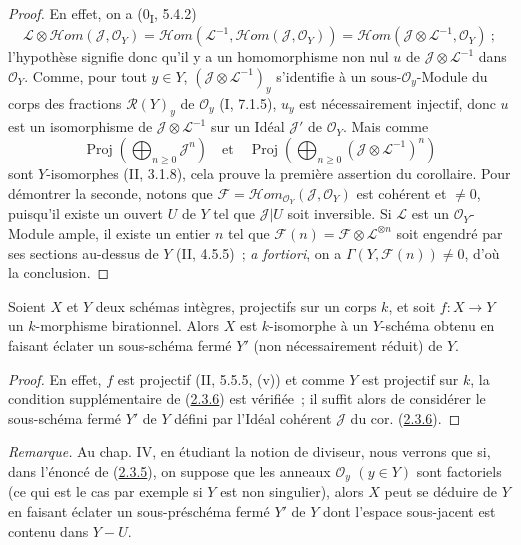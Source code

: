 \begin{proof}
En effet, on a (0\textsubscript{I}, 5.4.2)
\[
\mathcal L\otimes\mathcal{H}om(\mathcal J,\mathcal O_Y)
=\mathcal{H}om(\mathcal L^{-1},\mathcal{H}om(\mathcal J,\mathcal O_Y))
=\mathcal{H}om(\mathcal J\otimes\mathcal L^{-1},\mathcal O_Y)~;
\]
l'hypothèse signifie donc qu'il y a un homomorphisme non nul $u$ de
$\mathcal J\otimes\mathcal L^{-1}$ dans $\mathcal O_Y$. Comme, pour tout
$y\in Y$, $(\mathcal J\otimes\mathcal L^{-1})_y$ s'identifie à un
sous-$\mathcal O_y$-Module du corps des fractions $\mathcal R(Y)_y$ de
$\mathcal O_y$ (I, 7.1.5), $u_y$ est nécessairement injectif, donc $u$
est un isomorphisme de $\mathcal J\otimes\mathcal L^{-1}$ sur un Idéal
$\mathcal J'$ de $\mathcal O_Y$. Mais comme
\[
\operatorname{Proj}\left(\bigoplus_{n\geq0}\mathcal J^n\right)
\quad\text{et}\quad
\operatorname{Proj}\left(
\bigoplus_{n\geq0}(\mathcal J\otimes\mathcal L^{-1})^n\right)
\]
sont $Y$-isomorphes (II, 3.1.8), cela prouve la première assertion du
corollaire. Pour démontrer la seconde, notons que
$\mathcal F=\mathcal{H}om_{\mathcal O_Y}(\mathcal J,\mathcal O_Y)$ est
cohérent et $\neq0$, puisqu'il existe un ouvert $U$ de $Y$ tel que
$\mathcal J|U$ soit inversible. Si $\mathcal L$ est un
$\mathcal O_Y$-Module ample, il existe un entier $n$ tel que
$\mathcal F(n)=\mathcal F\otimes\mathcal L^{\otimes n}$ soit engendré par
ses sections au-dessus de $Y$ (II, 4.5.5)~; \emph{a fortiori}, on a
$\Gamma(Y,\mathcal F(n))\neq0$, d'où la conclusion.
\end{proof}

\begin{corollary}[2.3.7]
\label{III.2.3.7-fr}
Soient $X$ et $Y$ deux schémas intègres, projectifs sur un corps $k$, et
soit $f:X\to Y$ un $k$-morphisme birationnel. Alors $X$ est $k$-isomorphe
à un $Y$-schéma obtenu en faisant éclater un sous-schéma fermé $Y'$
(non nécessairement réduit) de $Y$.
\end{corollary}

\begin{proof}
En effet, $f$ est projectif (II, 5.5.5, (v)) et comme $Y$ est projectif
sur $k$, la condition supplémentaire de
(\hyperref[III.2.3.6-fr]{2.3.6}) est vérifiée~; il suffit alors de
considérer le sous-schéma fermé $Y'$ de $Y$ défini par l'Idéal cohérent
$\mathcal J$ du cor. (\hyperref[III.2.3.6-fr]{2.3.6}).
\end{proof}

\begin{env}[2.3.8]
\label{III.2.3.8-fr}
\emph{Remarque.} Au chap. IV, en étudiant la notion de diviseur, nous
verrons que si, dans l'énoncé de
(\hyperref[III.2.3.5-fr]{2.3.5}), on suppose que les anneaux
$\mathcal O_y$ $(y\in Y)$ sont factoriels (ce qui est le cas par exemple
si $Y$ est non singulier), alors $X$ peut se déduire de $Y$ en faisant
éclater un sous-préschéma fermé $Y'$ de $Y$ dont l'espace sous-jacent est
contenu dans $Y-U$.
\end{env}

